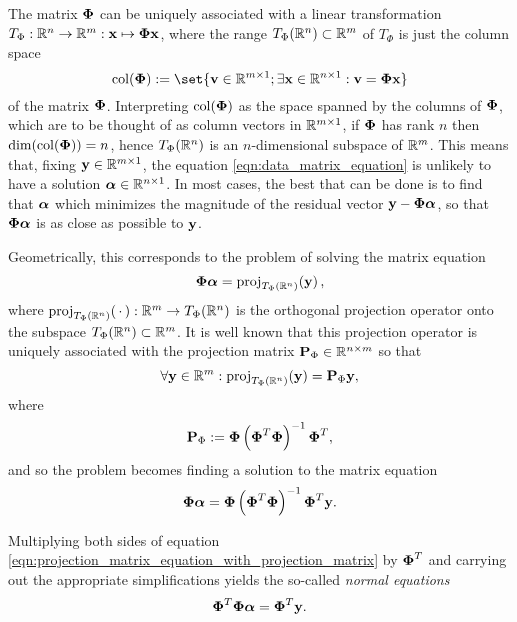   The matrix $\boldsymbol{\Phi}$ can be uniquely associated with a linear transformation $T_{\Phi} : \mathbb{R}^n \to \mathbb{R}^m : \mathbf{x} \mapsto \boldsymbol{\Phi} \mathbf{x}$, where the range $T_{\Phi}(\mathbb{R}^n) \subset \mathbb{R}^m$ of $T_{\Phi}$ is just the column space
  $$
    \colsp{\bPhi} := \set{\bv \in \bbR^{m \times 1} ; \exists \bx \in \bbR^{n \times 1} : \bv = \bPhi \bx}
  $$
  of the matrix $\boldsymbol{\Phi}$. Interpreting $\mathrm{col}\!\left(\boldsymbol{\Phi}\right)$ as the space spanned by the columns of $\boldsymbol{\Phi}$, which are to be thought of as column vectors in $\mathbb{R}^{m \times 1}$, if $\boldsymbol{\Phi}$ has rank $n$ then $\dim(\mathrm{col}\!\left(\boldsymbol{\Phi}\right)) = n$, hence $T_{\Phi}(\mathbb{R}^n)$ is an $n$-dimensional subspace of $\mathbb{R}^m$. This means that, fixing $\mathbf{y} \in \mathbb{R}^{m \times 1}$, the equation \eqref{eqn:data_matrix_equation} is unlikely to have a solution $\boldsymbol{\alpha} \in \mathbb{R}^{n \times 1}$. In most cases, the best that can be done is to find that $\boldsymbol{\alpha}$ which minimizes the magnitude of the residual vector $\mathbf{y} - \boldsymbol{\Phi}\boldsymbol{\alpha}$, so that $\boldsymbol{\Phi}\boldsymbol{\alpha}$ is as close as possible to $\mathbf{y}$.
  
  Geometrically, this corresponds to the problem of solving the matrix equation
  \begin{equation}
  \label{eqn:projection_matrix_equation}
    \bPhi \balpha = \proj[T_{\Phi}(\bbR^n)]{\by},
  \end{equation}
  where $\proj[T_{\Phi}(\bbR^n)]{\slota} : \bbR^m \to T_{\Phi}(\bbR^n)$ is the orthogonal projection operator onto the subspace $T_{\Phi}(\mathbb{R}^n) \subset \mathbb{R}^m$. It is well known that this projection operator is uniquely associated with the projection matrix $\mathbf{P}_{\Phi} \in \mathbb{R}^{n \times m}$ so that
  $$
    \forall \by \in \bbR^m : \proj[T_{\Phi}(\bbR^n)]{\by} = \bP_{\Phi} \by,
  $$
  where
  \begin{equation}
  \label{eqn:projection_matrix_definition}
    \mathbf{P}_{\Phi} := \boldsymbol{\Phi} \left(\boldsymbol{\Phi}^T\boldsymbol{\Phi}\right)^{-1} \boldsymbol{\Phi}^T,
  \end{equation}
  and so the problem becomes finding a solution to the matrix equation
  \begin{equation}
  \label{eqn:projection_matrix_equation_with_projection_matrix}
    \boldsymbol{\Phi} \boldsymbol{\alpha} = \boldsymbol{\Phi} \left(\boldsymbol{\Phi}^T\boldsymbol{\Phi}\right)^{-1} \boldsymbol{\Phi}^T \mathbf{y}.
  \end{equation}
  
  Multiplying both sides of equation \eqref{eqn:projection_matrix_equation_with_projection_matrix} by $\boldsymbol{\Phi}^T$ and carrying out the appropriate simplifications yields the so-called \emph{normal equations}
  \begin{equation}
  \label{eqn:normal_equations}
    \boldsymbol{\Phi}^T \boldsymbol{\Phi} \boldsymbol{\alpha} = \boldsymbol{\Phi}^T \mathbf{y}.
  \end{equation}
